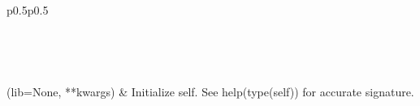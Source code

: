 \documentclass[letterpaper,10pt,english]{sphinxmanual}
\begin{document}
\begin{savenotes}\sphinxatlongtablestart\begin{longtable}[c]{p{0.5\linewidth}p{0.5\linewidth}}
\hline

\endfirsthead

%
{}\\
\hline

\endhead

\hline
{}\\
\endfoot

\endlastfoot

{\hyperref[\detokenize{autoapi/pine/pipelines/pmap_ner/index:pine.pipelines.pmap_ner.NER}]{}}(lib=None, **kwargs)
&
Initialize self.  See help(type(self)) for accurate signature.
\\
\hline
\end{longtable}\sphinxatlongtableend\end{savenotes}

\begin{fulllineitems}
\label{\detokenize{autoapi/pine/pipelines/pmap_ner/index:pine.pipelines.pmap_ner.logger}}
\end{fulllineitems}

\end{document}

